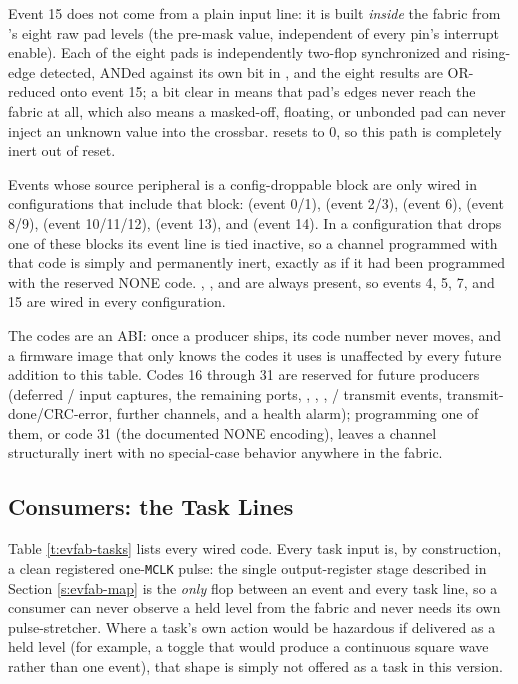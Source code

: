 \noindent Event 15 does not come from a plain input line: it is built \textit{inside} the fabric from 's eight raw pad levels (the pre-mask value, independent of every pin's  interrupt enable). Each of the eight pads is independently two-flop synchronized and rising-edge detected, ANDed against its own bit in , and the eight results are OR-reduced onto event 15; a bit clear in  means that pad's edges never reach the fabric at all, which also means a masked-off, floating, or unbonded pad can never inject an unknown value into the crossbar.  resets to 0, so this path is completely inert out of reset.

Events whose source peripheral is a config-droppable block are only wired in configurations that include that block:  (event 0/1),  (event 2/3),  (event 6),  (event 8/9),  (event 10/11/12),  (event 13), and  (event 14). In a configuration that drops one of these blocks its event line is tied inactive, so a channel programmed with that  code is simply and permanently inert, exactly as if it had been programmed with the reserved NONE code. , , and  are always present, so events 4, 5, 7, and 15 are wired in every configuration.

The  codes are an ABI: once a producer ships, its code number never moves, and a firmware image that only knows the codes it uses is unaffected by every future addition to this table. Codes 16 through 31 are reserved for future producers (deferred / input captures, the remaining  ports, , , , / transmit events,  transmit-done/CRC-error, further  channels, and a  health alarm); programming one of them, or code 31 (the documented NONE encoding), leaves a channel structurally inert with no special-case behavior anywhere in the fabric.

\subsection{Consumers: the Task Lines}
\label{s:evfab-tasks}

Table \ref{t:evfab-tasks} lists every wired  code. Every task input is, by construction, a clean registered one-\texttt{MCLK} pulse: the single output-register stage described in Section \ref{s:evfab-map} is the \textit{only} flop between an event and every task line, so a consumer can never observe a held level from the fabric and never needs its own pulse-stretcher. Where a task's own action would be hazardous if delivered as a held level (for example, a toggle that would produce a continuous square wave rather than one event), that shape is simply not offered as a task in this version.

